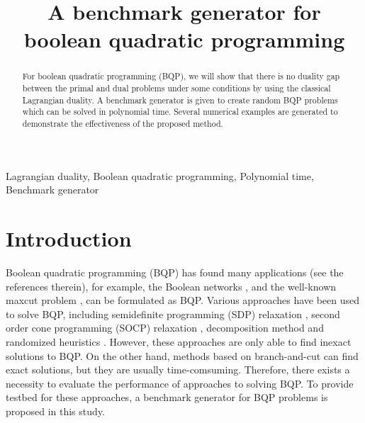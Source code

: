 \documentclass[conference]{IEEEtran}
\begin{document}
\title{A benchmark generator for boolean quadratic programming\\
}

\author{
\and
{}
}

\maketitle

\begin{abstract}
For boolean quadratic programming (BQP), we will show that there is no duality gap between the primal and dual problems under some conditions by using the classical Lagrangian duality.
A benchmark generator is given to create random BQP problems which can be solved in polynomial time. Several numerical examples are generated to demonstrate the effectiveness of the proposed method.
\end{abstract}
\setlength{\parskip}{4pt}
\begin{IEEEkeywords}
Lagrangian duality, Boolean quadratic programming, Polynomial time, Benchmark generator
\end{IEEEkeywords}

\section{Introduction}
Boolean quadratic programming (BQP) has found many applications (see \cite{billionnet2007using} the  references therein), for example, the Boolean networks \cite{cheng2010linear}, and the well-known maxcut problem \cite{marti2009advanced}, can be formulated as BQP. Various approaches have been used to solve BQP, including semidefinite programming (SDP) relaxation \cite{poljak1995recipe}, second order cone programming (SOCP) relaxation  \cite{kim2001second}, decomposition method \cite{elloumi2000decomposition} and randomized heuristics \cite{festa2002randomized}. However, these approaches are only able to find inexact solutions to BQP. On the other hand, methods based on branch-and-cut \cite{leyffer2001integrating} can find exact solutions, but they are usually time-comsuming. 
Therefore, there exists a necessity to evaluate the performance of approaches to solving BQP. 
To provide testbed for these approaches, a benchmark generator for BQP problems is proposed in this study. 
\end{document}
